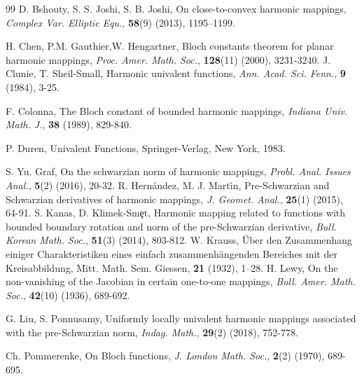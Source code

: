 \documentclass[a4paper,12pt]{amsart}
\theoremstyle{definition}
\begin{document}
\begin{thebibliography}{99}
{\sc D. Bshouty, S. S. Joshi, S. B. Joshi},  On close-to-convex harmonic mappings,    {\it Complex Var. Elliptic Equ.}, {\bf 58}(9) (2013), 1195–1199.








		{\sc H. Chen, P.M. Gauthier,W.  Hengartner}, Bloch constants theorem for planar harmonic mappings, {\it Proc. Amer. Math. Soc.}, {\bf 128}(11) (2000), 3231-3240.
%		
%		
		{\sc J. Clunie, T. Sheil-Small}, Harmonic univalent functions, {\it Ann. Acad. Sci. Fenn.}, {\bf 9} (1984), 3-25.
		
%		
		{\sc F. Colonna}, The Bloch constant of bounded harmonic mappings, {\it Indiana Univ. Math. J.}, {\bf 38} (1989), 829-840.
		
		
		 {\sc P. Duren}, Univalent Functions, Springer-Verlag, New York, 1983.
		
%		
%		
		{\sc S. Yu. Graf}, On the schwarzian norm of harmonic mappings, {\it Probl. Anal. Issues Anal.}, {\bf 5}(2) (2016), 20-32.
%		
%		
		{\sc R. Hern{\'a}ndez, M. J. Mart{\'\i}n},  Pre-Schwarzian and Schwarzian derivatives of harmonic mappings, {\it J. Geomet. Anal.}, {\bf 25}(1)  (2015), 64-91.
%		
%		
		{\sc S. Kanas, D. Klimek-Sm\c{e}t}, Harmonic mapping related to functions with bounded boundary rotation and norm of the pre-Schwarzian derivative, {\it Bull. Korean Math. Soc.}, {\bf 51}(3)  (2014), 803-812.
%		
%		
		 {\sc W. Krauss}, {\"U}ber den Zusammenhang einiger Charakteristiken eines einfach zusammenh{\"a}ngenden Bereiches mit der Kreisabbildung, Mitt. Math. Sem. Giessen, {\bf 21} (1932), 1–28.
%		
%		
	{\sc H. Lewy}, On the non-vanishing of the Jacobian in certain one-to-one mappings, {\it Bull. Amer. Math. Soc.}, {\bf 42}(10) (1936), 689-692.	
		
%		
		{\sc G. Liu, S. Ponnusamy}, Uniformly locally univalent harmonic mappings associated with the pre-Schwarzian norm, {\it Indag. Math.}, {\bf 29}(2) (2018), 752-778.
		
%		
%		
%		
%		
%		
%		
%		
%		
		{\sc Ch. Pommerenke}, On Bloch functions, {\it J. London Math. Soc.}, {\bf 2}(2) (1970), 689-695.
		

\end{thebibliography}
\end{document}
